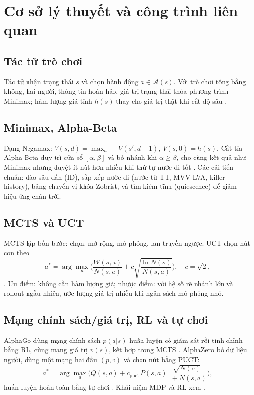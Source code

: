 \documentclass[13pt,a4paper]{extreport}
\begin{document}
\chapter{Cơ sở lý thuyết và công trình liên quan}
\section{Tác tử trò chơi}
Tác tử nhận trạng thái $s$ và chọn hành động $a\in\mathcal A(s)$. Với trò chơi tổng bằng không, hai người, thông tin hoàn hảo, giá trị trạng thái thỏa phương trình Minimax; hàm lượng giá tĩnh $h(s)$ thay cho giá trị thật khi cắt độ sâu \cite{russell2021}.

\section{Minimax, Alpha-Beta}
Dạng Negamax: $V(s,d)=\max_a\,-V(s',d-1)$, $V(s,0)=h(s)$. Cắt tỉa Alpha-Beta duy trì cửa sổ $[\alpha,\beta]$ và bỏ nhánh khi $\alpha\ge\beta$, cho cùng kết quả như Minimax nhưng duyệt ít nút hơn nhiều khi thứ tự nước đi tốt \cite{knuth1975}. Các cải tiến chuẩn: đào sâu dần (ID), sắp xếp nước đi (nước từ TT, MVV-LVA, killer, history), bảng chuyển vị khóa Zobrist, và tìm kiếm tĩnh (quiescence) để giảm hiệu ứng chân trời.

\section{MCTS và UCT}
MCTS lặp bốn bước: chọn, mở rộng, mô phỏng, lan truyền ngược. UCT chọn nút con theo
\begin{equation}
a^*=\arg\max_a\Big(\frac{W(s,a)}{N(s,a)}+c\sqrt{\frac{\ln N(s)}{N(s,a)}}\Big),\quad c=\sqrt2,
\end{equation}
\cite{kocsis2006}. Ưu điểm: không cần hàm lượng giá; nhược điểm: với hệ số rẽ nhánh lớn và rollout ngẫu nhiên, ước lượng giá trị nhiễu khi ngân sách mô phỏng nhỏ.

\section{Mạng chính sách/giá trị, RL và tự chơi}
AlphaGo dùng mạng chính sách $p(a|s)$ huấn luyện có giám sát rồi tinh chỉnh bằng RL, cùng mạng giá trị $v(s)$, kết hợp trong MCTS \cite{silver2016}. AlphaZero bỏ dữ liệu người, dùng một mạng hai đầu $(p,v)$ và chọn nút bằng PUCT:
\begin{equation}
a^*=\arg\max_a\Big(Q(s,a)+c_{\text{puct}}\,P(s,a)\frac{\sqrt{N(s)}}{1+N(s,a)}\Big),
\end{equation}
huấn luyện hoàn toàn bằng tự chơi \cite{silver2017}. Khái niệm MDP và RL xem \cite{sutton2018}.
\end{document}
